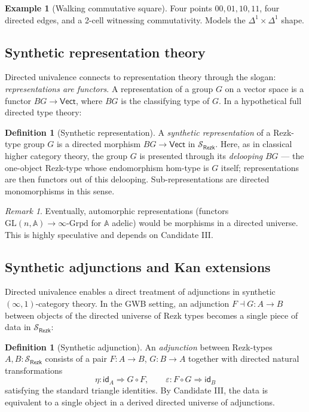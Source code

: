 \documentclass[12pt]{article}
\theoremstyle{definition}
\newtheorem{definition}[theorem]{Definition}
\newtheorem{example}[theorem]{Example}
\theoremstyle{remark}
\newtheorem{remark}[theorem]{Remark}
\newcommand{\id}{\mathsf{id}}
\begin{document}
\begin{example}[Walking commutative square]\label{ex:walking-square}
Four points $00, 01, 10, 11$, four directed edges, and a 2-cell witnessing commutativity. Models the $\Delta^1 \times \Delta^1$ shape.
\end{example}

\subsection{Synthetic representation theory}

Directed univalence connects to representation theory through the slogan: \emph{representations are functors}. A representation of a group $G$ on a vector space is a functor $BG \to \mathsf{Vect}$, where $BG$ is the classifying type of $G$. In a hypothetical full directed type theory:

\begin{definition}[Synthetic representation]\label{def:rep}
A \emph{synthetic representation} of a Rezk-type group $G$ is a directed morphism $BG \to \mathsf{Vect}$ in $\mathcal{S}_{\mathsf{Rezk}}$. Here, as in classical higher category theory, the group $G$ is presented through its \emph{delooping} $BG$ --- the one-object Rezk-type whose endomorphism hom-type is $G$ itself; representations are then functors out of this delooping. Sub-representations are directed monomorphisms in this sense.
\end{definition}

\begin{remark}\label{rem:langlands-distant}
Eventually, automorphic representations (functors $\mathrm{GL}(n, \mathbb{A}) \to \infty\text{-Grpd}$ for $\mathbb{A}$ adelic) would be morphisms in a directed universe. This is highly speculative and depends on Candidate III\@.
\end{remark}

\subsection{Synthetic adjunctions and Kan extensions}

Directed univalence enables a direct treatment of adjunctions in synthetic $(\infty,1)$-category theory. In the GWB setting, an adjunction $F \dashv G : A \to B$ between objects of the directed universe of Rezk types becomes a single piece of data in $\mathcal{S}_{\mathsf{Rezk}}$:

\begin{definition}[Synthetic adjunction]\label{def:synth-adj}
An \emph{adjunction} between Rezk-types $A, B : \mathcal{S}_{\mathsf{Rezk}}$ consists of a pair $F : A \to B$, $G : B \to A$ together with directed natural transformations
\[
\eta : \id_A \Rightarrow G \circ F, \qquad \varepsilon : F \circ G \Rightarrow \id_B
\]
satisfying the standard triangle identities. By Candidate III, the data is equivalent to a single object in a derived directed universe of adjunctions.
\end{definition}
\end{document}
